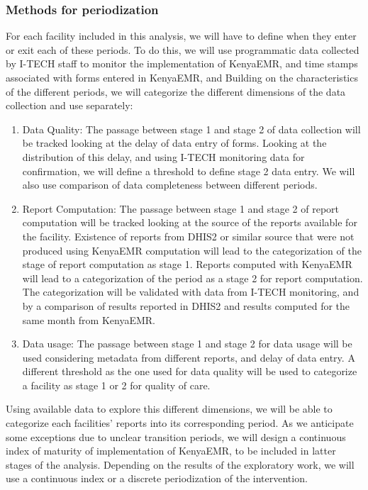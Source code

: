 
\subsubsection{Methods for periodization}
For each facility included in this analysis, we will have to define when they enter or exit each of these periods. To do this, we will use programmatic data collected by I-TECH staff to monitor the implementation of KenyaEMR, and time stamps associated with forms entered in KenyaEMR, and Building on the characteristics of the different periods, we will categorize the different dimensions of the data collection and use separately:

\begin{enumerate}
	\item    Data Quality: The passage between stage 1 and stage 2 of data collection will be tracked looking at the delay of data entry of forms. Looking at the distribution of this delay, and using I-TECH monitoring data for confirmation, we will define a threshold to define stage 2 data entry. We will also use comparison of data completeness between different periods.
	\item	Report Computation: The passage between stage 1 and stage 2 of report computation will be tracked looking at the source of the reports available for the facility. Existence of reports from DHIS2 or similar source that were not produced using KenyaEMR computation will lead to the categorization of the stage of report computation as stage 1. Reports computed with KenyaEMR will lead to a categorization of the period as a stage 2 for report computation. The categorization will be validated with data from I-TECH monitoring, and by a comparison of results reported in DHIS2 and results computed for the same month from KenyaEMR.
	\item	Data usage: The passage between stage 1 and stage 2 for data usage will be used considering metadata from different reports, and delay of data entry. A different threshold as the one used for data quality will be used to categorize a facility as stage 1 or 2 for quality of care.
\end{enumerate}

Using available data to explore this different dimensions, we will be able to categorize each facilities’ reports into its corresponding period. As we anticipate some exceptions due to unclear transition periods, we will design a continuous index of maturity of implementation of KenyaEMR, to be included in latter stages of the analysis. Depending on the results of the exploratory work, we will use a continuous index or a discrete periodization of the intervention.

